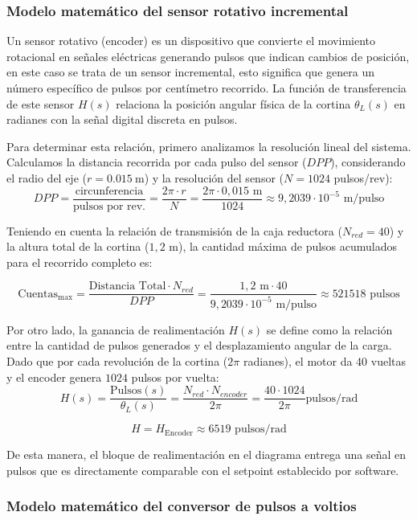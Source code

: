 \subsubsection{Modelo matemático del sensor rotativo incremental}
\label{sensor}
Un sensor rotativo (encoder) es un dispositivo que convierte el movimiento rotacional en señales eléctricas generando pulsos que indican cambios de posición, en este caso se trata de un sensor incremental, esto significa que genera un número específico de pulsos por centímetro recorrido. La función de transferencia de este sensor $H(s)$ relaciona la posición angular física de la cortina $\theta_L(s)$ en radianes con la señal digital discreta en pulsos. 

Para determinar esta relación, primero analizamos la resolución lineal del sistema. Calculamos la distancia recorrida por cada pulso del sensor ($DPP$), considerando el radio del eje ($r = \SI{0,015}{\meter}$) y la resolución del sensor ($N = 1024$ pulsos/rev):
\[
DPP = \frac{\text{circunferencia}}{\text{pulsos por rev.}} = \frac{2\pi \cdot r}{N} = \frac{2\pi \cdot 0,015 \text{ m}}{1024} \approx 9,2039 \cdot 10^{-5} \text{ m/pulso}
\]

Teniendo en cuenta la relación de transmisión de la caja reductora ($N_{red} = 40$) y la altura total de la cortina ($1,2$ m), la cantidad máxima de pulsos acumulados para el recorrido completo es:

\[
\text{Cuentas}_{\text{max}} = \frac{\text{Distancia Total} \cdot N_{red}}{DPP} = \frac{1,2 \text{ m} \cdot 40}{9,2039 \cdot 10^{-5} \text{ m/pulso}} \approx 521518 \text{ pulsos}
\]

Por otro lado, la ganancia de realimentación $H(s)$ se define como la relación entre la cantidad de pulsos generados y el desplazamiento angular de la carga. Dado que por cada revolución de la cortina ($2\pi$ radianes), el motor da 40 vueltas y el encoder genera $1024$ pulsos por vuelta:
\[
H(s) = \frac{\text{Pulsos}(s)}{\theta_L(s)} = \frac{N_{red} \cdot N_{encoder}}{2\pi} = \frac{40 \cdot 1024}{2\pi}\text{pulsos/rad}
\]

\begin{equation}
	H = H_{\text{Encoder}} \approx 6519 \text{ pulsos/rad} \label{eq:fdt_realimentacion}
\end{equation}

De esta manera, el bloque de realimentación en el diagrama entrega una señal en pulsos que es directamente comparable con el setpoint establecido por software.

\subsubsection{Modelo matemático del conversor de pulsos a voltios}

